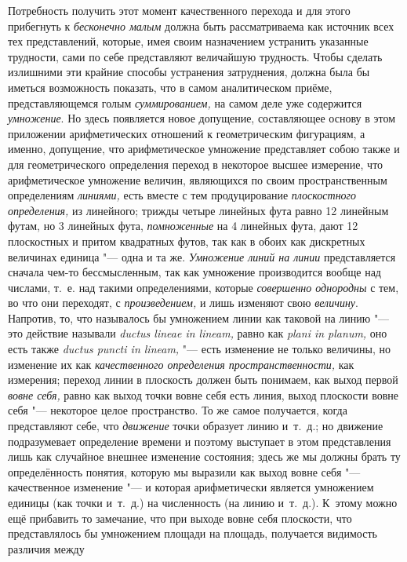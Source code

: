 Потребность получить этот момент качественного перехода и для этого прибегнуть
к {\em бесконечно малым} должна быть рассматриваема как источник всех тех
представлений, которые, имея своим назначением устранить указанные трудности,
сами по себе представляют величайшую трудность. Чтобы сделать излишними эти
крайние способы устранения затруднения, должна была бы иметься возможность
показать, что в самом аналитическом приёме, представляющемся голым
{\em суммированием,} на самом деле уже содержится {\em умножение}. Но здесь
появляется новое допущение, составляющее основу в этом приложении
арифметических отношений к геометрическим фигурациям, а именно, допущение, что
арифметическое умножение представляет собою также и для геометрического
определения переход в некоторое высшее измерение, что арифметическое умножение
величин, являющихся по своим пространственным определениям {\em линиями,} есть
вместе с тем продуцирование {\em плоскостного определения,} из линейного;
трижды четыре линейных фута равно 12 линейным футам, но 3 линейных фута,
{\em помноженные} на 4 линейных фута, дают 12 плоскостных и притом квадратных
футов, так как в обоих как дискретных величинах единица "--- одна и та же.
{\em Умножение линий на линии} представляется сначала чем-то бессмысленным, так
как умножение производится вообще над числами, т.~е. над такими определениями,
которые {\em совершенно однородны} с тем, во что они переходят, с
{\em произведением,} и лишь изменяют свою {\em величину}. Напротив, то, что
называлось бы умножением линии как таковой на линию "--- это действие называли
{\em ductus lineae in lineam,} равно как {\em plani in planum,} оно есть также
{\em ductus puncti in lineam,} "--- есть изменение не только величины, но
изменение их как {\em качественного определения пространственности,} как
измерения; переход линии в плоскость должен быть понимаем, как выход первой
{\em вовне себя,} равно как выход точки вовне себя есть линия, выход плоскости
вовне себя "--- некоторое целое пространство. То же самое получается, когда
представляют себе, что {\em движение} точки образует линию и~т.~д.; но движение
подразумевает определение времени и поэтому выступает в этом представления лишь
как случайное внешнее изменение состояния; здесь же мы должны брать ту
определённость понятия, которую мы выразили как выход вовне себя "---
качественное изменение "--- и которая арифметически является умножением единицы
(как точки и~т.~д.) на численность (на линию и~т.~д.). К~этому можно ещё
прибавить то замечание, что при выходе вовне себя плоскости, что представлялось
бы умножением площади на площадь, получается видимость различия между
